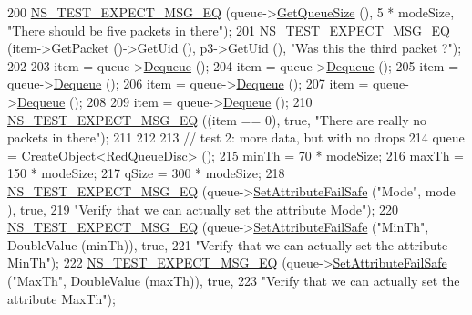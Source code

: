\begin{DoxyCode}
200   \hyperlink{group__testing_ga7304ba46a28d8cf08dfdfd6499cf7068}{NS\_TEST\_EXPECT\_MSG\_EQ} (queue->\hyperlink{classns3_1_1RedQueueDisc_aa201a831b85c287a99d7a5e04455b463}{GetQueueSize} (), 5 * modeSize, \textcolor{stringliteral}{"There
       should be five packets in there"});
201   \hyperlink{group__testing_ga7304ba46a28d8cf08dfdfd6499cf7068}{NS\_TEST\_EXPECT\_MSG\_EQ} (item->GetPacket ()->GetUid (), p3->GetUid (), \textcolor{stringliteral}{"Was this the
       third packet ?"});
202 
203   item = queue->\hyperlink{classns3_1_1QueueDisc_a6c13fc489822c1487f61c2289f2e3629}{Dequeue} ();
204   item = queue->\hyperlink{classns3_1_1QueueDisc_a6c13fc489822c1487f61c2289f2e3629}{Dequeue} ();
205   item = queue->\hyperlink{classns3_1_1QueueDisc_a6c13fc489822c1487f61c2289f2e3629}{Dequeue} ();
206   item = queue->\hyperlink{classns3_1_1QueueDisc_a6c13fc489822c1487f61c2289f2e3629}{Dequeue} ();
207   item = queue->\hyperlink{classns3_1_1QueueDisc_a6c13fc489822c1487f61c2289f2e3629}{Dequeue} ();
208 
209   item = queue->\hyperlink{classns3_1_1QueueDisc_a6c13fc489822c1487f61c2289f2e3629}{Dequeue} ();
210   \hyperlink{group__testing_ga7304ba46a28d8cf08dfdfd6499cf7068}{NS\_TEST\_EXPECT\_MSG\_EQ} ((item == 0), \textcolor{keyword}{true}, \textcolor{stringliteral}{"There are really no packets in there"});
211 
212 
213   \textcolor{comment}{// test 2: more data, but with no drops}
214   queue = CreateObject<RedQueueDisc> ();
215   minTh = 70 * modeSize;
216   maxTh = 150 * modeSize;
217   qSize = 300 * modeSize;
218   \hyperlink{group__testing_ga7304ba46a28d8cf08dfdfd6499cf7068}{NS\_TEST\_EXPECT\_MSG\_EQ} (queue->\hyperlink{classns3_1_1ObjectBase_aa7d333004e970f925a4ed5df275541b5}{SetAttributeFailSafe} (\textcolor{stringliteral}{"Mode"}, mode
      ), \textcolor{keyword}{true},
219                          \textcolor{stringliteral}{"Verify that we can actually set the attribute Mode"});
220   \hyperlink{group__testing_ga7304ba46a28d8cf08dfdfd6499cf7068}{NS\_TEST\_EXPECT\_MSG\_EQ} (queue->\hyperlink{classns3_1_1ObjectBase_aa7d333004e970f925a4ed5df275541b5}{SetAttributeFailSafe} (\textcolor{stringliteral}{"MinTh"}, 
      DoubleValue (minTh)), \textcolor{keyword}{true},
221                          \textcolor{stringliteral}{"Verify that we can actually set the attribute MinTh"});
222   \hyperlink{group__testing_ga7304ba46a28d8cf08dfdfd6499cf7068}{NS\_TEST\_EXPECT\_MSG\_EQ} (queue->\hyperlink{classns3_1_1ObjectBase_aa7d333004e970f925a4ed5df275541b5}{SetAttributeFailSafe} (\textcolor{stringliteral}{"MaxTh"}, 
      DoubleValue (maxTh)), \textcolor{keyword}{true},
223                          \textcolor{stringliteral}{"Verify that we can actually set the attribute MaxTh"});

\end{DoxyCode}
